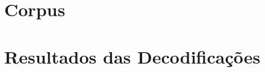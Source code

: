 \documentclass[12pt,twoside,a4paper]{book}
\begin{document}
\chapter{Corpus}
\label{ap:corpus}


\chapter{Resultados das Decodificações}
\label{ap:results}


\backmatter





\end{document}
